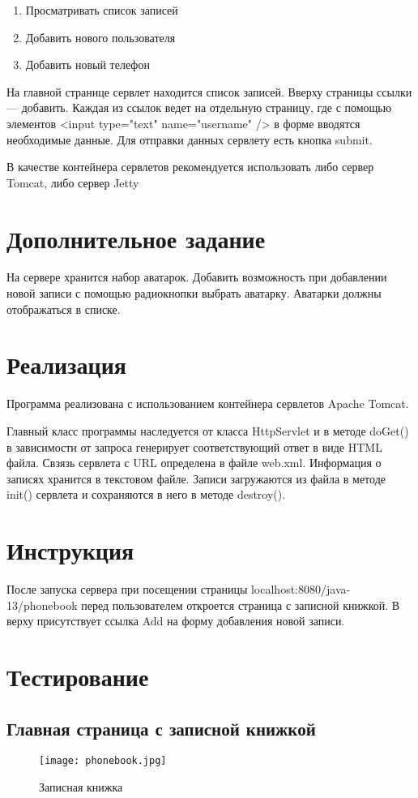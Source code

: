 \documentclass{article}
\begin{document}
\begin{enumerate}
	\item Просматривать список записей
	\item Добавить нового пользователя
	\item Добавить новый телефон

\end{enumerate}

На главной странице сервлет находится список записей. Вверху страницы ссылки --- добавить. Каждая из ссылок ведет на отдельную страницу, где с помощью элементов <input type="text" name="username" /> в форме вводятся необходимые данные. Для отправки данных сервлету есть кнопка submit. 

В качестве контейнера сервлетов рекомендуется использовать либо сервер Tomcat, либо сервер Jetty

\section{Дополнительное задание}
На сервере хранится набор аватарок. Добавить возможность при добавлении новой записи с помощью радиокнопки выбрать аватарку. Аватарки должны отображаться в списке.

\section{Реализация}
Программа реализована с использованием контейнера сервлетов Apache Tomcat.

Главный класс программы наследуется от класса HttpServlet и в методе doGet() в зависимости от запроса генерирует соответствующий ответ в виде HTML файла.
Свзязь сервлета с URL определена в файле web.xml.
Информация о записях хранится в текстовом файле. Записи загружаются из файла в методе init() сервлета и сохраняются в него в методе destroy().

\section{Инструкция}
После запуска сервера при посещении страницы localhost:8080/java-13/phonebook перед пользователем откроется страница с записной книжкой. В верху присутствует ссылка Add на форму добавления новой записи.
\section{Тестирование}

\subsection{Главная страница с записной книжкой}
\begin{figure}[H]
	\begin{flushleft}
		\centerline{\texttt{[image: phonebook.jpg]}}
		\caption{Записная книжка}
	\end{flushleft}
\end{figure}
\vspace{3cm}
\end{document}
